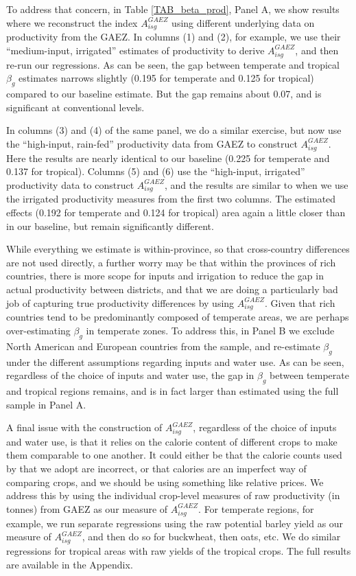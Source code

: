 \documentclass[11pt]{article}
\begin{document}
To address that concern, in Table \ref{TAB_beta_prod}, Panel A, we show results where we reconstruct the index $A_{isg}^{GAEZ}$ using different underlying data on productivity from the GAEZ. In columns (1) and (2), for example, we use their ``medium-input, irrigated'' estimates of productivity to derive $A_{isg}^{GAEZ}$, and then re-run our regressions. As can be seen, the gap between temperate and tropical $\beta_g$ estimates narrows slightly (0.195 for temperate and 0.125 for tropical) compared to our baseline estimate. But the gap remains about 0.07, and is significant at conventional levels.

In columns (3) and (4) of the same panel, we do a similar exercise, but now use the ``high-input, rain-fed'' productivity data from GAEZ to construct $A_{isg}^{GAEZ}$. Here the results are nearly identical to our baseline (0.225 for temperate and 0.137 for tropical). Columns (5) and (6) use the ``high-input, irrigated'' productivity data to construct $A_{isg}^{GAEZ}$, and the results are similar to when we use the irrigated productivity measures from the first two columns. The estimated effects (0.192 for temperate and 0.124 for tropical) area again a little closer than in our baseline, but remain significantly different.

While everything we estimate is within-province, so that cross-country differences are not used directly, a further worry may be that within the provinces of rich countries, there is more scope for inputs and irrigation to reduce the gap in actual productivity between districts, and that we are doing a particularly bad job of capturing true productivity differences by using $A_{isg}^{GAEZ}$. Given that rich countries tend to be predominantly composed of temperate areas, we are perhaps over-estimating $\beta_g$ in temperate zones. To address this, in Panel B we exclude North American and European countries from the sample, and re-estimate $\beta_g$ under the different assumptions regarding inputs and water use. As can be seen, regardless of the choice of inputs and water use, the gap in $\beta_g$ between temperate and tropical regions remains, and is in fact larger than estimated using the full sample in Panel A. 

A final issue with the construction of $A^{GAEZ}_{isg}$, regardless of the choice of inputs and water use, is that it relies on the calorie content of different crops to make them comparable to one another. It could either be that the calorie counts used by \cite{galorozak2016} that we adopt are incorrect, or that calories are an imperfect way of comparing crops, and we should be using something like relative prices. We address this by using the individual crop-level measures of raw productivity (in tonnes) from GAEZ as our measure of $A^{GAEZ}_{isg}$. For temperate regions, for example, we run separate regressions using the raw potential barley yield as our measure of $A^{GAEZ}_{isg}$, and then do so for buckwheat, then oats, etc. We do similar regressions for tropical areas with raw yields of the tropical crops. The full results are available in the Appendix. 
\end{document}
